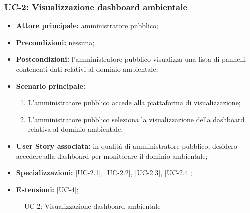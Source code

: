 \documentclass[8pt]{article}
\begin{document}
\subsubsection*{UC-2: Visualizzazione dashboard ambientale}
\begin{itemize}
    \item \textbf{Attore principale:} amministratore pubblico;
    \item \textbf{Precondizioni: }nessuna;
    \item \textbf{Postcondizioni:} l'amministratore pubblico visualizza una lista di pannelli
        contenenti dati relativi al dominio ambientale;
    \item \textbf{Scenario principale:} 
    \begin{enumerate}
    \item L’amministratore pubblico accede alla piattaforma di visualizzazione;
    \item L’amministratore pubblico seleziona la visualizzazione della dashboard relativa al dominio
        ambientale.
    \end{enumerate}
    \item \textbf{User Story associata:} in qualità di amministratore pubblico, desidero accedere alla dashboard per monitorare il dominio ambientale;
    \item \textbf {Specializzazioni:} [UC-2.1], [UC-2.2], [UC-2.3], [UC-2.4];  
    \item \textbf{Estensioni:} [UC-4];
\end{itemize}

\begin{figure}[ht!]
    \centering
    \caption{UC-2: Visualizzazione dashboard ambientale}
    \label{fig:UC-2: Visualizzazione dashboard ambientale}
\end{figure}
\end{document}
